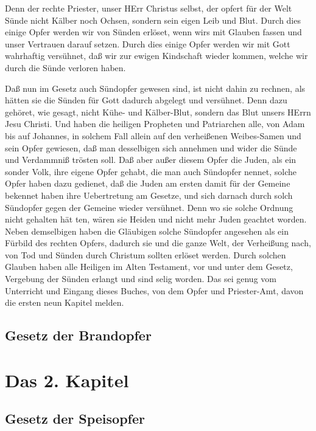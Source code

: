 Denn der rechte Priester, unser HErr Christus selbst, der opfert für der Welt Sünde nicht Kälber noch Ochsen, sondern sein eigen Leib und Blut. Durch dies einige Opfer werden wir von Sünden erlöset, wenn wirs mit Glauben fassen und unser Vertrauen darauf setzen. Durch dies einige Opfer werden wir mit Gott wahrhaftig versühnet, daß wir zur ewigen Kindschaft wieder kommen, welche wir durch die Sünde verloren haben.

Daß nun im Gesetz auch Sündopfer gewesen sind, ist nicht dahin zu rechnen, als hätten sie die Sünden für Gott dadurch abgelegt und versühnet. Denn dazu gehöret, wie gesagt, nicht Kühe- und Kälber-Blut, sondern das Blut unsers HErrn Jesu Christi. Und haben die heiligen Propheten und Patriarchen alle, von Adam bis auf Johannes, in solchem Fall allein auf den verheißenen Weibes-Samen und sein Opfer gewiesen, daß man desselbigen sich annehmen und wider die Sünde und Verdammniß trösten soll. Daß aber außer diesem Opfer die Juden, als ein sonder Volk, ihre eigene Opfer gehabt, die man auch Sündopfer nennet, solche Opfer haben dazu gedienet, daß die Juden am ersten damit für der Gemeine bekennet haben ihre Uebertretung am Gesetze, und sich darnach durch solch Sündopfer gegen der Gemeine wieder versühnet. Denn wo sie solche Ordnung nicht gehalten hät%
ten,
wären sie Heiden und nicht mehr Juden geachtet worden. Neben demselbigen haben die Gläubigen solche Sündopfer angesehen als ein Fürbild des rechten Opfers, dadurch sie und die ganze Welt, der Verheißung nach, von Tod und Sünden durch Christum sollten erlöset werden. Durch solchen Glauben haben alle Heiligen im Alten Testament, vor und unter dem Gesetz, Vergebung der Sünden erlangt und sind selig worden. Das sei genug vom Unterricht und Eingang dieses Buches, von dem Opfer und Priester-Amt, davon die ersten neun Kapitel melden.

\section{Gesetz der Brandopfer}

\chapter{Das 2. Kapitel}

\section{Gesetz der Speisopfer}

